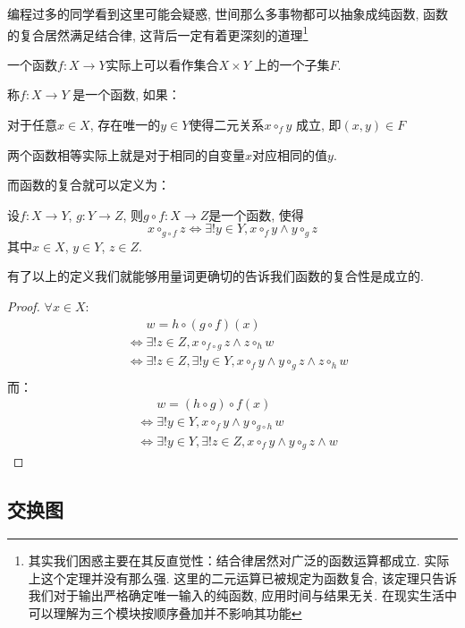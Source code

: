 编程过多的同学看到这里可能会疑惑, 世间那么多事物都可以抽象成纯函数, 函数的复合居然满足结合律,
这背后一定有着更深刻的道理\footnote{其实我们困惑主要在其反直觉性：结合律居然对广泛的函数运算都成立.
    实际上这个定理并没有那么强. 这里的二元运算已被规定为函数复合, 该定理只告诉我们对于输出严格确定唯一输入的纯函数,
应用时间与结果无关. 在现实生活中可以理解为三个模块按顺序叠加并不影响其功能}

一个函数\(f: X \to Y\)实际上可以看作集合\(X \times Y\) 上的一个子集\(F\).

\begin{definition}
    称\(f: X\to Y\) 是一个函数, 如果：

    对于任意\(x\in X\), 存在唯一的\(y\in Y\)使得二元关系\(x \circ_{f} y\)
    成立, 即\((x,y)\in F\)
\end{definition}

两个函数相等实际上就是对于相同的自变量\(x\)对应相同的值\(y\).

而函数的复合就可以定义为：
\begin{definition}
    设\(f: X\to Y\), \(g: Y\to Z\), 则\(g\circ f: X \to Z\)是一个函数, 使得
    \[
        x \circ_{g\circ f} z \iff \exists! y \in Y, x
        \circ_{f} y \land y \circ_{g} z
    \]
    其中\(x\in X\), \(y\in Y\), \(z\in Z\).
\end{definition}
有了以上的定义我们就能够用量词更确切的告诉我们函数的复合性是成立的.

\begin{proof}
    \(\forall x \in X\):
    \begin{align*}
        &\mathrel{\phantom{\iff}}w=h \circ(g\circ f)(x) \\
        &\iff \exists! z \in Z, x \circ_{f\circ g} z \land z
        \circ_{h} w\\
        &\iff \exists! z \in Z, \exists! y \in Y, x
        \circ_{f} y \land y \circ_{g} z \land z
        \circ_{h} w\\
    \end{align*}
    而：
    \begin{align*}
        &\mathrel{\phantom{\iff}}w=(h\circ g)\circ f(x) \\
        &\iff \exists! y \in Y, x \circ_{f} y \land y
        \circ_{g \circ h} w\\
        &\iff \exists! y \in Y, \exists! z \in Z, x
        \circ_{f} y \land y
        \circ_{g} z \land w
    \end{align*}
\end{proof}

\subsection{交换图}

